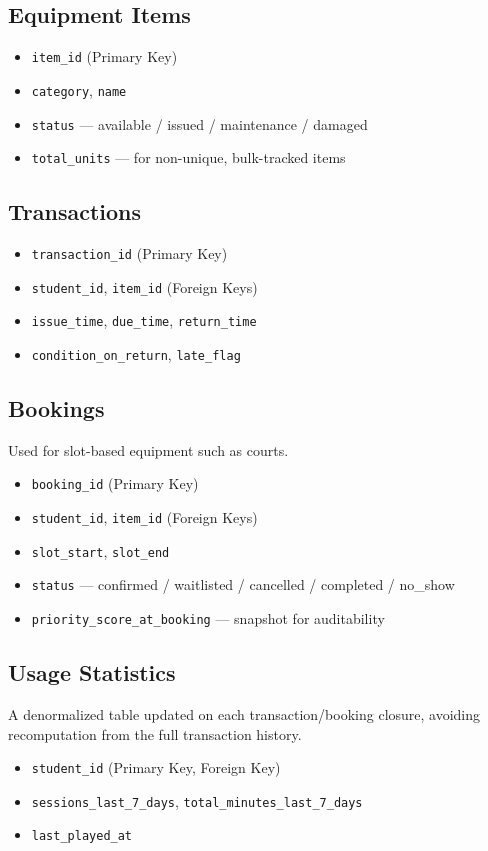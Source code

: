 \documentclass{article}
\begin{document}
\subsection{Equipment Items}
\begin{itemize}
    \item \texttt{item\_id} (Primary Key)
    \item \texttt{category}, \texttt{name}
    \item \texttt{status} — available / issued / maintenance / damaged
    \item \texttt{total\_units} — for non-unique, bulk-tracked items
\end{itemize}

\subsection{Transactions}
\begin{itemize}
    \item \texttt{transaction\_id} (Primary Key)
    \item \texttt{student\_id}, \texttt{item\_id} (Foreign Keys)
    \item \texttt{issue\_time}, \texttt{due\_time}, \texttt{return\_time}
    \item \texttt{condition\_on\_return}, \texttt{late\_flag}
\end{itemize}

\subsection{Bookings}
Used for slot-based equipment such as courts.
\begin{itemize}
    \item \texttt{booking\_id} (Primary Key)
    \item \texttt{student\_id}, \texttt{item\_id} (Foreign Keys)
    \item \texttt{slot\_start}, \texttt{slot\_end}
    \item \texttt{status} — confirmed / waitlisted / cancelled / completed / no\_show
    \item \texttt{priority\_score\_at\_booking} — snapshot for auditability
\end{itemize}

\subsection{Usage Statistics}
A denormalized table updated on each transaction/booking closure, avoiding recomputation from the full transaction history.
\begin{itemize}
    \item \texttt{student\_id} (Primary Key, Foreign Key)
    \item \texttt{sessions\_last\_7\_days}, \texttt{total\_minutes\_last\_7\_days}
    \item \texttt{last\_played\_at}
\end{itemize}
\end{document}
